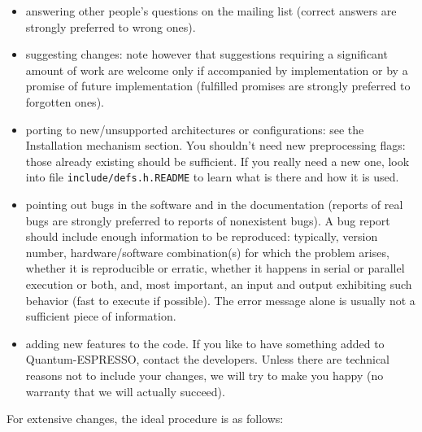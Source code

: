 \documentclass[12pt,a4paper]{article}
\begin{document}
\begin{itemize}
\item answering other people's questions on the mailing list (correct answers are strongly preferred to wrong ones).
\item  suggesting changes: note however that suggestions requiring a significant amount of work are welcome only if accompanied by implementation or by a promise of future implementation (fulfilled promises are strongly preferred to forgotten ones).
\item porting to new/unsupported architectures or configurations: see the Installation mechanism section. You shouldn't need new preprocessing flags: those already existing should be sufficient. If you really need a new one, look into file \texttt{include/defs.h.README} to learn what is there and how it is used.
\item pointing out bugs in the software and in the documentation (reports of real bugs are strongly preferred to reports of nonexistent bugs). A bug report should include enough information to be reproduced: typically, version number, hardware/software combination(s) for which the problem arises, whether it is reproducible or erratic, whether it happens in serial or parallel execution or both, and, most important, an input and output exhibiting such behavior (fast to execute if possible). The error message alone is usually not a sufficient piece of information.
\item adding new features to the code. If you like to have something added to Quantum-ESPRESSO, contact the developers. Unless there are technical reasons not to include your changes, we will try to make you happy (no warranty that we will actually succeed).
\end{itemize}

For extensive changes, the ideal procedure is as follows:
\end{document}
